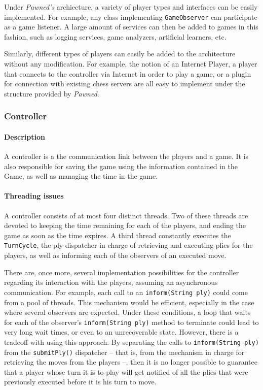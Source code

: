 																Under \emph{Pawned's} archiecture, a variety of player types and interfaces can 
																be easily implemented. For example, any class implementing \texttt{GameObserver}
																can participate as a game listener. A large amount of services can then be added to games
																in this fashion, such as logging services, game analyzers, artificial learners, etc.
																 
																Similarly, different types of players can easily be added to the architecture without 
																any modification. For example, the notion of an Internet Player, a player that connects
																to the controller via Internet in order to play a game, or a plugin for connection with 
																existing chess servers are all easy to implement under the structure provided by 
																\emph{Pawned}.

			\subsubsection{Controller}
				\paragraph{Description} A controller is a the communication link between the players and a game. 
																It is also responsible for saving the game using the information contained
																in the Game, as well as managing the time in the game. 
				\paragraph{Threading issues} A controller consists of at most four distinct threads. Two of these
												threads are devoted to keeping the time remaining for each of the players, and 
												ending the game as soon as the time expires. A third thread constantly executes the
												\texttt{TurnCycle}, the ply dispatcher in charge of retrieving and executing plies for the 
												players, as well as informing each of the observers of an executed move. 
												
												There are, once more, several implementation possibilities for the controller regarding its
												interaction with the players, assuming an asynchronous communication. For example, each call to 
												an \texttt{inform(String ply)} could come from a pool of threads. This mechanism would be efficient, 
												especially in the case where several observers are expected. Under these conditions, a loop that waits
												for each of the observer's \texttt{inform(String ply)} method to terminate could lead to very long wait 
												times, or even to an unrecoverable state. However, there is a tradeoff with using this approach. 
												By separating the calls to \texttt{inform(String ply)} from the \texttt{submitPly()} dispatcher -- 
												that is, from the mechanism in charge for retrieving the moves from the players --, then it is no 
												longer possible to guarantee that a player whose turn it is to play will get notified of all the plies 
												that were previously executed before it is his turn to move. 
												

